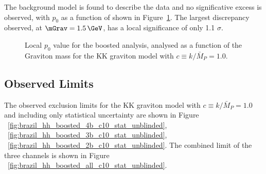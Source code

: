 The background model is found to describe the data and no significative excess is observed, with $p_0$ as a function of \mGrav shown in Figure~\ref{fig:p0_RSG10}. The largest discrepancy observed, at $\mGrav=1.5\,\GeV$, has a local significance of only 1.1 $\sigma$.

\begin{figure}[ht!]
\begin{center}
\caption{Local $p_0$ value for the boosted analysis, analysed as a function of the Graviton mass for the KK graviton model
with $c \equiv k/\bar{M}_P = 1.0$.}
\label{fig:p0_RSG10}
\end{center}
\end{figure}

\subsection{Observed Limits}
\label{sec:observedlimits}

The observed exclusion limits for the KK graviton model with  $c \equiv k/\bar{M}_P = 1.0$
and including only statistical uncertainty are shown in Figure ~\ref{fig:brazil_hh_boosted_4b_c10_stat_unblinded}, ~\ref{fig:brazil_hh_boosted_3b_c10_stat_unblinded}, ~\ref{fig:brazil_hh_boosted_2b_c10_stat_unblinded}. The combined limit of the three channels is shown in Figure ~\ref{fig:brazil_hh_boosted_all_c10_stat_unblinded}. 

\begin{figure*}
\begin{center}
\caption{The expected and observed 95\% C.L. exclusion limits for the boosted $4b$ analysis calculated including statistical uncertainty only
for the KK graviton model with $c \equiv k/\bar{M}_P = 1.0$. Limits are derived within the asymptotic approximation.}
\label{fig:brazil_hh_boosted_4b_c10_stat_unblinded}
\end{center}
\end{figure*}

\begin{figure*}
\begin{center}
\caption{The expected and observed 95\% C.L. exclusion limits for the boosted $3b$ analysis calculated including statistical uncertainty only
for the KK graviton model with $c \equiv k/\bar{M}_P = 1.0$. Limits are derived within the asymptotic approximation.}
\label{fig:brazil_hh_boosted_3b_c10_stat_unblinded}
\end{center}
\end{figure*}

